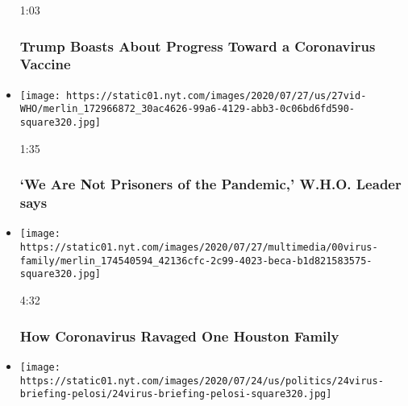 \begin{itemize}
  1:03

  \hypertarget{trump-boasts-about-progress-toward-a-coronavirus-vaccine}{%
  \subsubsection{Trump Boasts About Progress Toward a Coronavirus
  Vaccine}\label{trump-boasts-about-progress-toward-a-coronavirus-vaccine}}
\item
  \href{https://www.nytimes.com/video/world/100000007258544/who-pandemic-response.html?action=click\&module=video-series-bar\&region=header\&pgtype=Article\&playlistId=video/coronavirus-news-update}{}

  \texttt{[image: https://static01.nyt.com/images/2020/07/27/us/27vid-WHO/merlin\_172966872\_30ac4626-99a6-4129-abb3-0c06bd6fd590-square320.jpg]}

  1:35

  \hypertarget{we-are-not-prisoners-of-the-pandemic-who-leader-says}{%
  \subsubsection{`We Are Not Prisoners of the Pandemic,' W.H.O. Leader
  says}\label{we-are-not-prisoners-of-the-pandemic-who-leader-says}}
\item
  \href{https://www.nytimes.com/video/us/100000007253343/coronavirus-houston-family.html?action=click\&module=video-series-bar\&region=header\&pgtype=Article\&playlistId=video/coronavirus-news-update}{}

  \texttt{[image: https://static01.nyt.com/images/2020/07/27/multimedia/00virus-family/merlin\_174540594\_42136cfc-2c99-4023-beca-b1d821583575-square320.jpg]}

  4:32

  \hypertarget{how-coronavirus-ravaged-one-houston-family}{%
  \subsubsection{How Coronavirus Ravaged One Houston
  Family}\label{how-coronavirus-ravaged-one-houston-family}}
\item
  \href{https://www.nytimes.com/video/us/100000007256158/pelosi-rejects-unemployment-extension.html?action=click\&module=video-series-bar\&region=header\&pgtype=Article\&playlistId=video/coronavirus-news-update}{}

  \texttt{[image: https://static01.nyt.com/images/2020/07/24/us/politics/24virus-briefing-pelosi/24virus-briefing-pelosi-square320.jpg]}


\end{itemize}
